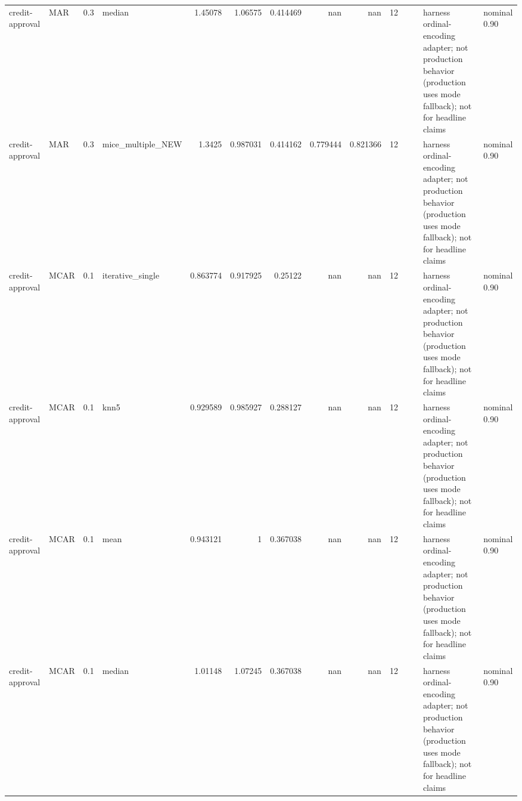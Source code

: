 \begin{table}[ht]
\begin{tabular}{llrlrrrrrrllll}
 credit-approval      & MAR         &         0.3 & median            &       1.45078  &             1.06575  &                 0.414469 &                     nan        &                       nan        &        12 &                    &                                         & harness ordinal-encoding adapter; not production behavior (production uses mode fallback); not for headline claims & nominal 0.90              \\
 credit-approval      & MAR         &         0.3 & mice\_multiple\_NEW &       1.3425   &             0.987031 &                 0.414162 &                       0.779444 &                         0.821366 &        12 &                    &                                         & harness ordinal-encoding adapter; not production behavior (production uses mode fallback); not for headline claims & nominal 0.90              \\
 credit-approval      & MCAR        &         0.1 & iterative\_single  &       0.863774 &             0.917925 &                 0.25122  &                     nan        &                       nan        &        12 &                    &                                         & harness ordinal-encoding adapter; not production behavior (production uses mode fallback); not for headline claims & nominal 0.90              \\
 credit-approval      & MCAR        &         0.1 & knn5              &       0.929589 &             0.985927 &                 0.288127 &                     nan        &                       nan        &        12 &                    &                                         & harness ordinal-encoding adapter; not production behavior (production uses mode fallback); not for headline claims & nominal 0.90              \\
 credit-approval      & MCAR        &         0.1 & mean              &       0.943121 &             1        &                 0.367038 &                     nan        &                       nan        &        12 &                    &                                         & harness ordinal-encoding adapter; not production behavior (production uses mode fallback); not for headline claims & nominal 0.90              \\
 credit-approval      & MCAR        &         0.1 & median            &       1.01148  &             1.07245  &                 0.367038 &                     nan        &                       nan        &        12 &                    &                                         & harness ordinal-encoding adapter; not production behavior (production uses mode fallback); not for headline claims & nominal 0.90              \\

\end{tabular}
\end{table}
